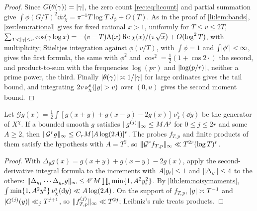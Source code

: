 \begin{proof}
Since $G(\theta(\gamma))=\lvert\gamma\rvert$, the zero count \eqref{rec:eq:licount} and partial summation give
$\int\phi(G/T)^2\dd\nu^{\mathrm s}_\chi=\pi^{-1}T\log T\,J_\phi+O(T)$. As in the proof of \cref{li:lem:bands},
\cref{zer:lem:rational} gives for fixed rational $x>1$, uniformly for $T\le v\le2T$,
$\sum_{T<\lvert\gamma\rvert\le v}\cos(\gamma\log x)=-(v-T)\Lambda(x)\operatorname{Re}\chi(x)/(\pi\sqrt x)+O(\log^2T)$, with multiplicity;
Stieltjes integration against $\phi(v/T)$, with $\int\phi=1$ and $\int\lvert\phi'\rvert<\infty$, gives the first formula,
the same with $\phi^2$ and $\cos^2=\frac12(1+\cos2\cdot)$ the second, and product-to-sum with the
frequencies $\log(pr)$ and $\lvert\log(p/r)\rvert$, neither a prime power, the third. Finally $\lvert\theta(\gamma)\rvert\asymp1/\lvert\gamma\rvert$
for large ordinates gives the tail bound, and integrating $2v\,\nu^{\mathrm s}_\chi(\lvert y\rvert>v)$ over $(0,u)$ gives the
second moment bound.
\end{proof}

\begin{lemma}\label{lih:lem:generator}
Let $\mathcal Gg(x)=\frac12\int[g(x+y)+g(x-y)-2g(x)]\,\nu^{\mathrm s}_\chi(\dd y)$ be the generator of $X^\chi$. If a bounded smooth
$g$ satisfies $\lVert g^{(j)}\rVert_\infty\le MA^j$ for $0\le j\le2r$ and some $A\ge2$, then
$\lVert\mathcal G^rg\rVert_\infty\le C_rM[A\log(2A)]^r$. The probes $f_{T,p}$ and finite products of them satisfy the
hypothesis with $A=T^2$, so $\lVert\mathcal G^rf_{T,p}\rVert_\infty\ll T^{2r}(\log T)^r$.
\end{lemma}

\begin{proof}
With $\Delta_yg(x)=g(x+y)+g(x-y)-2g(x)$, apply the second-derivative integral formula to the increments
with $A\lvert y_i\rvert\le1$ and $\lVert\Delta_y\rVert\le4$ to the others: $\lVert\Delta_{y_1}\cdots\Delta_{y_r}g\rVert_\infty\le4^rM\prod_i\min\{1,A^2y_i^2\}$.
By \cref{lih:lem:noisymoments}, $\int\min\{1,A^2y^2\}\,\nu^{\mathrm s}_\chi(\mathrm{d} y)\ll A\log(2A)$. On the support of $f_{T,p}$,
$\lvert y\rvert\asymp T^{-1}$ and $\lvert G^{(j)}(y)\rvert\ll_jT^{j+1}$, so $\lVert f_{T,p}^{(j)}\rVert_\infty\ll T^{2j}$; Leibniz's rule treats products.
\end{proof}

